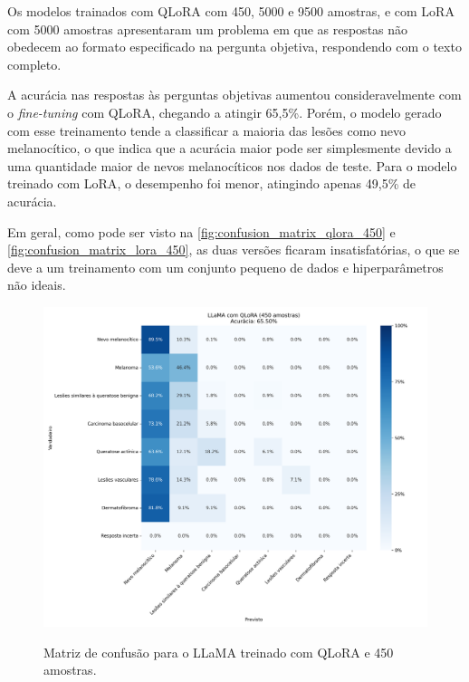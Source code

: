 Os modelos trainados com \ac{QLoRA} com 450, 5000 e 9500 amostras, e com \ac{LoRA} com 5000 amostras apresentaram um
problema em que as respostas não obedecem ao formato especificado na pergunta objetiva, respondendo com o texto
completo.

A acurácia nas respostas às perguntas objetivas aumentou consideravelmente com o \textit{fine-tuning} com \ac{QLoRA},
chegando a atingir 65,5\%. Porém, o modelo gerado com esse treinamento tende a classificar a maioria das lesões como
nevo melanocítico, o que indica que a acurácia maior pode ser simplesmente devido a uma quantidade maior de nevos
melanocíticos nos dados de teste. Para o modelo treinado com \ac{LoRA}, o desempenho foi menor, atingindo apenas 49,5\%
de acurácia.

Em geral, como pode ser visto na \autoref{fig:confusion_matrix_qlora_450} e \autoref{fig:confusion_matrix_lora_450}, as
duas versões ficaram insatisfatórias, o que se deve a um treinamento com um conjunto pequeno de dados e hiperparâmetros
não ideais.

\begin{figure}[ht]
    \centering
    \caption{\small Matriz de confusão para o \ac{LLaMA} treinado com \ac{QLoRA} e 450 amostras.}
    \includegraphics[width=1\columnwidth,keepaspectratio]{images/confusion_matrix_qlora_450.png}
    \label{fig:confusion_matrix_qlora_450}
\end{figure}

\clearpage

